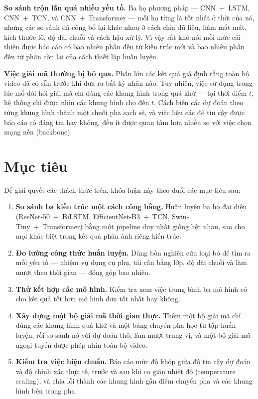\documentclass[11pt,a4paper]{report}
\begin{document}
\textbf{So sánh trộn lẫn quá nhiều yếu tố.} Ba họ phương pháp --- CNN~+~LSTM, CNN~+~TCN, và CNN~+~Transformer --- mỗi họ từng là tốt nhất ở thời của nó, nhưng các so sánh đã công bố lại khác nhau ở cách chia dữ liệu, hàm mất mát, kích thước lô, độ dài chuỗi và cách hậu xử lý. Vì vậy rất khó nói mỗi mức cải thiện được báo cáo có bao nhiêu phần đến từ kiến trúc mới và bao nhiêu phần đến từ phần còn lại của cách thiết lập huấn luyện.

\textbf{Việc giải mã thường bị bỏ qua.} Phần lớn các kết quả giả định rằng toàn bộ video đã có sẵn trước khi đưa ra bất kỳ nhãn nào. Tuy nhiên, việc sử dụng trong lúc mổ đòi hỏi giải mã chỉ dùng các khung hình trong quá khứ --- tại thời điểm $t$, hệ thống chỉ được nhìn các khung hình cho đến $t$. Cách biến các dự đoán theo từng khung hình thành một chuỗi pha sạch sẽ, và việc liệu các độ tin cậy được báo cáo có đáng tin hay không, đều ít được quan tâm hơn nhiều so với việc chọn mạng nền (backbone).

\section{Mục tiêu}

Để giải quyết các thách thức trên, khóa luận này theo đuổi các mục tiêu sau:
\begin{enumerate}
    \item \textbf{So sánh ba kiến trúc một cách công bằng.} Huấn luyện ba họ đại diện (ResNet-50~+~BiLSTM, EfficientNet-B3~+~TCN, Swin-Tiny~+~Transformer) bằng một pipeline duy nhất giống hệt nhau, sao cho mọi khác biệt trong kết quả phản ánh riêng kiến trúc.
    \item \textbf{Đo lường công thức huấn luyện.} Dùng bốn nghiên cứu loại bỏ để tìm ra mỗi yếu tố --- nhiệm vụ dụng cụ phụ, tái cân bằng lớp, độ dài chuỗi và làm mượt theo thời gian --- đóng góp bao nhiêu.
    \item \textbf{Thử kết hợp các mô hình.} Kiểm tra xem việc trung bình ba mô hình có cho kết quả tốt hơn mô hình đơn tốt nhất hay không.
    \item \textbf{Xây dựng một bộ giải mã thời gian thực.} Thêm một bộ giải mã chỉ dùng các khung hình quá khứ và một bảng chuyển pha học từ tập huấn luyện, rồi so sánh nó với dự đoán thô, làm mượt trung vị, và một bộ giải mã ngoại tuyến được phép nhìn toàn bộ video.
    \item \textbf{Kiểm tra việc hiệu chuẩn.} Báo cáo mức độ khớp giữa độ tin cậy dự đoán và độ chính xác thực tế, trước và sau khi co giãn nhiệt độ (temperature scaling), và chia lỗi thành các khung hình gần điểm chuyển pha và các khung hình bên trong pha.
\end{enumerate}
\end{document}
